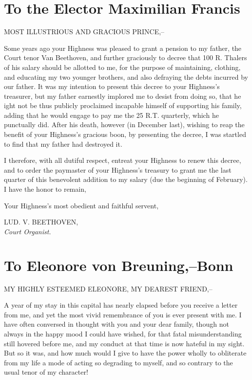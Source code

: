 \documentclass[12pt,oneside]{book}
\begin{document}
\chapter[To the Elector Maximilian Francis]{To the Elector Maximilian Francis\raisebox{.3\baselineskip}{\normalsize\footnotemark}}
MOST ILLUSTRIOUS AND GRACIOUS PRINCE,-- \par 

Some years ago your Highness was pleased to grant a pension to my father, the Court tenor Van Beethoven, and further graciously to decree that 100 R. Thalers of his salary should be allotted to me, for the purpose of maintaining, clothing, and educating my two younger brothers, and also defraying the debts incurred by our father. It was my intention to present this decree to your Highness's treasurer, but my father earnestly implored me to desist from doing so, that he ight not be thus publicly proclaimed incapable himself of supporting his family, adding that he would engage to pay me the 25 R.T. quarterly, which he punctually did. After his death, however (in December last), wishing to reap the benefit of your Highness's gracious boon, by presenting the decree, I was startled to find that my father had destroyed it. \par 

I therefore, with all dutiful respect, entreat your Highness to renew this decree, and to order the paymaster of your Highness's treasury to grant me the last quarter of this benevolent addition to my salary (due the beginning of February). I have the honor to remain, \par 

Your Highness's most obedient and faithful servent, 
\begin{flushright}
    LUD. V. BEETHOVEN,\\
    \textit{Court Organist.}
\end{flushright} \par

\chapter{To Eleonore von Breuning,--Bonn}
MY HIGHLY ESTEEMED ELEONORE, MY DEAREST FRIEND,-- \par 

A year of my stay in this capital has nearly elapsed before you receive a letter from me, and yet the most vivid remembrance of you is ever present with me. I have often conversed in thought with you and your dear family, though not always in the happy mood I could have wished, for that fatal misunderstanding still hovered before me, and my conduct at that time is now hateful in my sight. But so it was, and how much would I give to have the power wholly to obliterate from my life a mode of acting so degrading to myself, and so contrary to the usual tenor of my character! \par 
\end{document}
